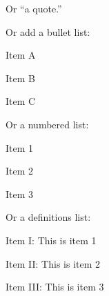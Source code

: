 \documentclass[11pt,twocolumn,letterpaper]{article}
\begin{document}
\noindent
Or ``a quote.''

\noindent
Or add a bullet list:

\begin{packed_item}
\item Item A
\item Item B
\item Item C
\end{packed_item}

\noindent
Or a numbered list:

\begin{packed_enum}
\item Item 1
\item Item 2
\item Item 3
\end{packed_enum}

\noindent
Or a definitions list:

\begin{packed_desc}
\item[Item I:] This is item 1 
\item[Item II:] This is item 2
\item[Item III:] This is item 3
\end{packed_desc}




\end{document}
